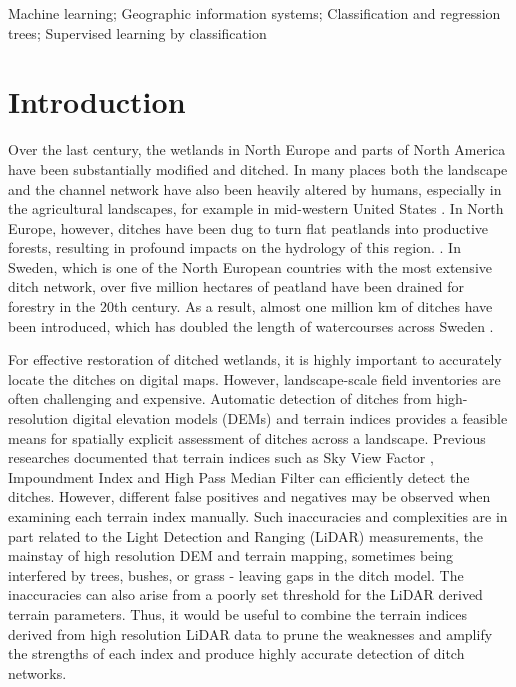 \documentclass[]{interact}
\theoremstyle{plain}%
\theoremstyle{definition}
\theoremstyle{remark}
\begin{document}
\begin{keywords}
Machine learning; Geographic information systems; Classification and regression trees; Supervised learning by classification
\end{keywords}


\section{Introduction} \label{introduction}

Over the last century, the wetlands in North Europe and parts of North America have been substantially modified and ditched. In many places both the landscape and the channel network have also been heavily altered  by humans, especially in the agricultural landscapes, for example in mid-western United States \citep{passalacqua}. In North Europe, however, ditches have been dug to turn flat peatlands into productive forests, resulting in profound impacts on the hydrology of this region. \citep{peatlands}. In Sweden, which is one of the North European countries with the most extensive ditch network, over five million hectares of peatland have been drained for forestry in the 20th century.  As a result, almost one million km of ditches have been introduced, which has doubled the length of watercourses across Sweden  \citep{hasselquist}.

For effective restoration of ditched wetlands, it is highly important  to accurately locate the ditches on digital maps. However, landscape-scale field inventories are often challenging and expensive. Automatic detection of ditches from high-resolution digital elevation models (DEMs) and terrain indices provides a feasible means for spatially explicit assessment of ditches across a landscape. Previous researches  \citep{uppsala} documented  that terrain indices such as Sky View Factor \citep{zaksek}, Impoundment Index \citep{whiteboxtools} and High Pass Median Filter \citep{whiteboxtools} can efficiently  detect the ditches. However, different false positives and negatives may be observed when examining each terrain index manually. Such inaccuracies and complexities are in part related to the Light Detection and Ranging (LiDAR) measurements, the mainstay of high resolution DEM and terrain mapping, sometimes being interfered by trees, bushes, or grass - leaving gaps in the ditch model. The inaccuracies can also arise from a poorly set threshold for the LiDAR derived terrain parameters. Thus, it would be useful to combine the terrain indices derived from high resolution LiDAR data to prune the weaknesses and amplify the strengths of each index and produce highly accurate detection of ditch networks.
\end{document}
